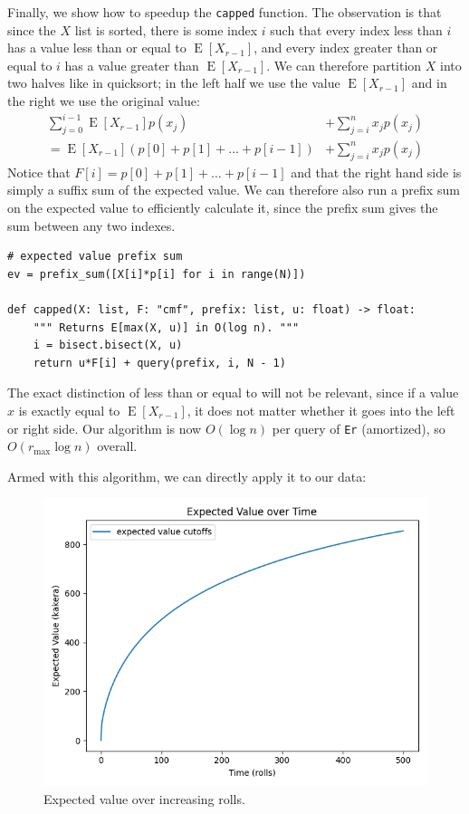 \documentclass[11pt, oneside]{article}
\DeclareMathOperator{\E}{E}
\theoremstyle{plain}
\theoremstyle{definition}
\begin{document}
Finally, we show how to speedup the \texttt{capped} function. The observation
is that since the \( X \) list is sorted, there is some index \( i \) such that
every index less than \( i \) has a value less than or equal to \( \E[X_{r -
1}] \), and every index greater than or equal to \( i \) has a value greater
than \( \E[X_{r - 1}] \). We can therefore partition \( X \) into two halves
like in quicksort; in the left half we use the value \( \E[X_{r - 1}] \) and
in the right we use the original value:
\begin{align*}
  \sum^{i - 1}_{j = 0} \E[X_{r - 1}] p(x_j) &+ \sum^n_{j = i} x_j p(x_j) \\
  = \E[X_{r - 1}](p[0] + p[1] + \dots + p[i - 1]) &+ \sum^n_{j = i} x_j p(x_j)
\end{align*}
Notice that \( F[i] = p[0] + p[1] + \dots + p[i - 1] \) and that the right hand
side is simply a suffix sum of the expected value. We can therefore also run a
prefix sum on the expected value to efficiently calculate it, since the prefix
sum gives the sum between any two indexes.
\begin{verbatim}
# expected value prefix sum
ev = prefix_sum([X[i]*p[i] for i in range(N)])

def capped(X: list, F: "cmf", prefix: list, u: float) -> float:
    """ Returns E[max(X, u)] in O(log n). """
    i = bisect.bisect(X, u)
    return u*F[i] + query(prefix, i, N - 1)
\end{verbatim}

The exact distinction of less than or equal to will not be relevant, since
if a value \( x \) is exactly equal to \( \E[X_{r - 1}] \), it does not matter
whether it goes into the left or right side. Our algorithm is now
\( O(\log n) \) per query of \texttt{Er} (amortized), so
\( O(r_\text{max} \log n) \) overall.

Armed with this algorithm, we can directly apply it to our data:
\begin{figure}
  \centering
  \includegraphics[scale=0.6]{graphs/expected_value/model.png}
  \caption{Expected value over increasing rolls.}
\end{figure}
\end{document}
